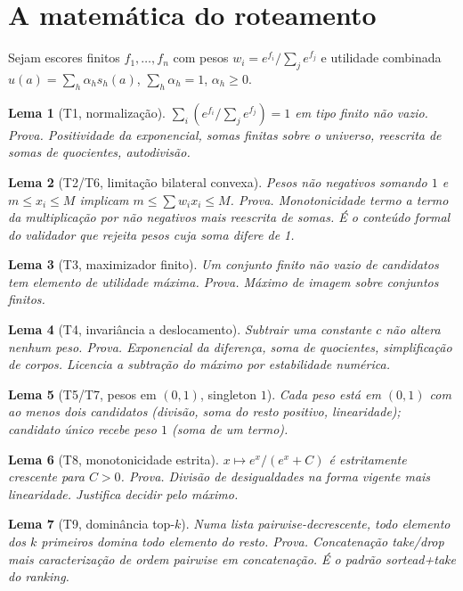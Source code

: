 \documentclass[11pt,a4paper]{article}
\newtheorem{lemma}{Lema}
\theoremstyle{definition}
\begin{document}
\section{A matemática do roteamento}
Sejam escores finitos $f_1,\dots,f_n$ com pesos $w_i=e^{f_i}/\sum_j e^{f_j}$ e utilidade combinada $u(a)=\sum_h\alpha_h s_h(a)$, $\sum_h\alpha_h=1$, $\alpha_h\ge 0$.
\begin{lemma}[T1, normalização]
$\sum_i (e^{f_i}/\sum_j e^{f_j})=1$ em tipo finito não vazio.
\textit{Prova.} Positividade da exponencial, somas finitas sobre o universo, reescrita de somas de quocientes, autodivisão. \end{lemma}
\begin{lemma}[T2/T6, limitação bilateral convexa]
Pesos não negativos somando $1$ e $m\le x_i\le M$ implicam $m\le\sum w_ix_i\le M$.
\textit{Prova.} Monotonicidade termo a termo da multiplicação por não negativos mais reescrita de somas. É o conteúdo formal do validador que rejeita pesos cuja soma difere de 1. \end{lemma}
\begin{lemma}[T3, maximizador finito]
Um conjunto finito não vazio de candidatos tem elemento de utilidade máxima.
\textit{Prova.} Máximo de imagem sobre conjuntos finitos. \end{lemma}
\begin{lemma}[T4, invariância a deslocamento]
Subtrair uma constante $c$ não altera nenhum peso.
\textit{Prova.} Exponencial da diferença, soma de quocientes, simplificação de corpos. Licencia a subtração do máximo por estabilidade numérica. \end{lemma}
\begin{lemma}[T5/T7, pesos em $(0,1)$, singleton $1$]
Cada peso está em $(0,1)$ com ao menos dois candidatos (divisão, soma do resto positivo, linearidade); candidato único recebe peso $1$ (soma de um termo). \end{lemma}
\begin{lemma}[T8, monotonicidade estrita]
$x\mapsto e^x/(e^x+C)$ é estritamente crescente para $C>0$.
\textit{Prova.} Divisão de desigualdades na forma vigente mais linearidade. Justifica decidir pelo máximo. \end{lemma}
\begin{lemma}[T9, dominância top-$k$]
Numa lista pairwise-decrescente, todo elemento dos $k$ primeiros domina todo elemento do resto.
\textit{Prova.} Concatenação take/drop mais caracterização de ordem pairwise em concatenação. É o padrão sortead+take do ranking. \end{lemma}
\end{document}
